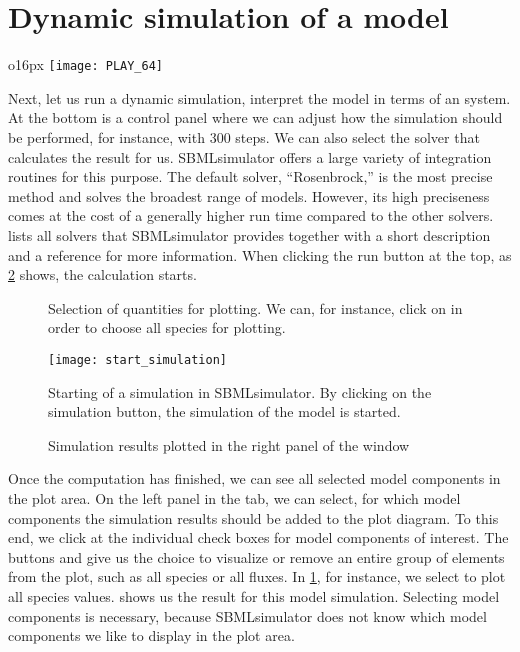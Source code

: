 \section{Dynamic simulation of a model}
\begin{wrapfigure}{o}{16px}
\vspace{\wrapfigspace}
\texttt{[image: PLAY\_64]}
\end{wrapfigure}
Next, let us run a dynamic simulation, \ie interpret the model in terms of an \ODE system.
At the bottom is a control panel where we can adjust how the simulation should be performed, for instance, with 300 steps.
We can also select the solver that calculates the result for us.
SBMLsimulator offers a large variety of integration routines for this purpose.
The default solver, ``Rosenbrock,'' is the most precise method and solves the broadest range of models.
However, its high preciseness comes at the cost of a generally higher run time compared to the other solvers.
 lists all solvers that SBMLsimulator provides together with a short description and a reference for more information.
When clicking the run button at the top, as \cref{fig:startSimulation} shows, the calculation starts.
\begin{figure}[t]
\centering
{}
\caption[Selection of quantities for plotting]{Selection of quantities for plotting.
We can, for instance, click on  in order to choose all species for plotting.}
\label{fig:selectSpecies}
\end{figure}
\begin{figure}[t]
\centering
\texttt{[image: start\_simulation]}
\caption[Starting of a simulation in SBMLsimulator]{Starting of a simulation in SBMLsimulator.
By clicking on the simulation button, the simulation of the model is started.}
\label{fig:startSimulation}
\end{figure}
\begin{figure}[t]
\centering
{}
\caption[Simulation results plotted in the right panel of the window]{Simulation results plotted in the right panel of the window}
\label{fig:simulationResults}
\end{figure}

Once the computation has finished, we can see all selected model components in the plot area.
On the left panel in the  tab, we can select, for which model components the simulation results should be added to the plot diagram.
To this end, we click at the individual check boxes for model components of interest.
The buttons  and  give us the choice to visualize or remove an entire group of elements from the plot, such as all species or all fluxes.
In \cref{fig:selectSpecies}, for instance, we select to plot all species values.
 shows us the result for this model simulation.
Selecting model components is necessary, because SBMLsimulator does not know which model components we like to display in the plot area.

